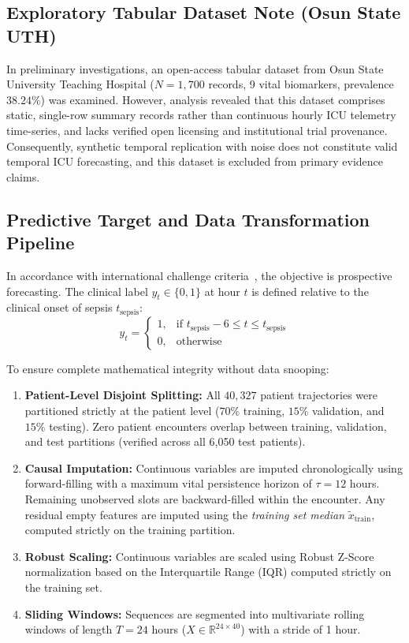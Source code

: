 \documentclass[11pt,a4paper]{article}
\begin{document}
\subsection{Exploratory Tabular Dataset Note (Osun State UTH)}
In preliminary investigations, an open-access tabular dataset from Osun State University Teaching Hospital ($N=1,700$ records, 9 vital biomarkers, prevalence $38.24\%$) was examined. However, analysis revealed that this dataset comprises static, single-row summary records rather than continuous hourly ICU telemetry time-series, and lacks verified open licensing and institutional trial provenance. Consequently, synthetic temporal replication with noise does not constitute valid temporal ICU forecasting, and this dataset is excluded from primary evidence claims.

\subsection{Predictive Target and Data Transformation Pipeline}
In accordance with international challenge criteria~\cite{reyna2020physionet}, the objective is prospective forecasting. The clinical label $y_t \in \{0, 1\}$ at hour $t$ is defined relative to the clinical onset of sepsis $t_{\text{sepsis}}$:
\begin{equation}
y_t = \begin{cases} 
1, & \text{if } t_{\text{sepsis}} - 6 \le t \le t_{\text{sepsis}} \\
0, & \text{otherwise} 
\end{cases}
\end{equation}

To ensure complete mathematical integrity without data snooping:
\begin{enumerate}
    \item \textbf{Patient-Level Disjoint Splitting:} All $40,327$ patient trajectories were partitioned strictly at the patient level ($70\%$ training, $15\%$ validation, and $15\%$ testing). Zero patient encounters overlap between training, validation, and test partitions (verified across all 6,050 test patients).
    \item \textbf{Causal Imputation:} Continuous variables are imputed chronologically using forward-filling with a maximum vital persistence horizon of $\tau = 12$ hours. Remaining unobserved slots are backward-filled within the encounter. Any residual empty features are imputed using the \textit{training set median} $\tilde{x}_{\text{train}}$, computed strictly on the training partition.
    \item \textbf{Robust Scaling:} Continuous variables are scaled using Robust Z-Score normalization based on the Interquartile Range (IQR) computed strictly on the training set.
    \item \textbf{Sliding Windows:} Sequences are segmented into multivariate rolling windows of length $T = 24$ hours ($X \in \mathbb{R}^{24 \times 40}$) with a stride of 1 hour.
\end{enumerate}
\end{document}
